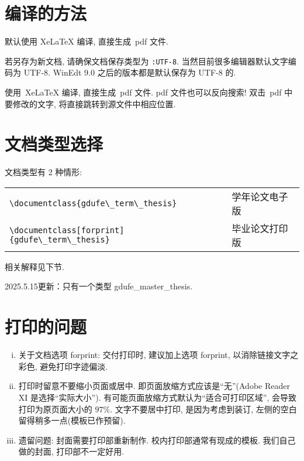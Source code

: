 \documentclass[class = professional]{gdufe_master_thesis}
\begin{document}
\section{编译的方法}\label{sec-compile}

默认使用 XeLaTeX 编译, 直接生成~pdf 文件.

若另存为新文档, 请确保文档保存类型为 \verb|:UTF-8|. 当然目前很多编辑器默认文字编码为 UTF-8.
WinEdt 9.0 之后的版本都是默认保存为 UTF-8 的.

使用~XeLaTeX 编译, 直接生成~pdf 文件.
pdf 文件也可以反向搜索! 双击~pdf 中要修改的文字, 将直接跳转到源文件中相应位置.

\section{文档类型选择}
文档类型有 2 种情形:

\begin{table}[ht]\centering
    \begin{tabular}{ll}
        \hline
        \verb|\documentclass{gdufe\_term\_thesis}|           & 学年论文电子版 \\
        \verb|\documentclass[forprint]{gdufe\_term\_thesis}| & 毕业论文打印版 \\
        \hline
    \end{tabular}
\end{table}
相关解释见下节.

2025.5.15更新：只有一个类型 gdufe\_master\_thesis.

\section{打印的问题}
\begin{enumerate}[i)]
    \item  关于文档选项 forprint: 交付打印时, 建议加上选项 forprint, 以消除链接文字之彩色, 避免打印字迹偏淡.
    \item  打印时留意不要缩小页面或居中. 即页面放缩方式应该是``无''(Adobe Reader XI 是选择``实际大小'').
          有可能页面放缩方式默认为``适合可打印区域'', 会导致打印为原页面大小的 $97\%$.
          文字不要居中打印, 是因为考虑到装订, 左侧的空白留得稍多一点(模板已作预留).
    \item  遗留问题: 封面需要打印部重新制作.  校内打印部通常有现成的模板.
          我们自己做的封面, 打印部不一定好用.
\end{enumerate}
\end{document}
